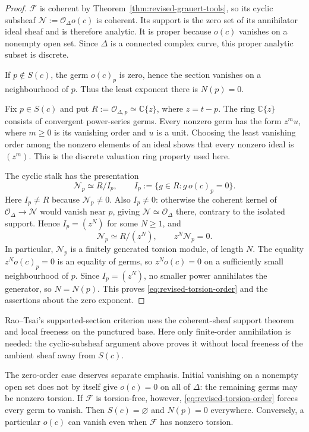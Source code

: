 \documentclass[11pt]{amsart}
\numberwithin{equation}{section}
\theoremstyle{plain}
\theoremstyle{definition}
\newcommand{\C}{\mathbb C}
\newcommand{\cF}{\mathcal F}
\newcommand{\cN}{\mathcal N}
\newcommand{\cO}{\mathcal O}
\begin{document}
\begin{proof}
$\cF$ is coherent by Theorem~\ref{thm:revised-grauert-tools}, so its cyclic
subsheaf $\cN:=\cO_\Delta o(c)$ is coherent.  Its support is the zero set
of its annihilator ideal sheaf and is therefore analytic.  It is proper
because $o(c)$ vanishes on a nonempty open set.  Since $\Delta$ is a
connected complex curve, this proper analytic subset is discrete.

If $p\notin S(c)$, the germ $o(c)_p$ is zero, hence the section vanishes
on a neighbourhood of $p$.  Thus the least exponent there is $N(p)=0$.

Fix $p\in S(c)$ and put $R:=\cO_{\Delta,p}\simeq\C\{z\}$, where
$z=t-p$.  The ring $\C\{z\}$ consists of convergent power-series germs.
Every nonzero germ has the form $z^m u$, where $m\ge0$ is its vanishing
order and $u$ is a unit.  Choosing the least vanishing order among the
nonzero elements of an ideal shows that every nonzero ideal is $(z^m)$.
This is the discrete valuation ring property used here.

The cyclic stalk has the presentation
\[
 \cN_p\simeq R/I_p,\qquad
 I_p:=\{g\in R:g\,o(c)_p=0\}.
\]
Here $I_p\ne R$ because $\cN_p\ne0$.  Also $I_p\ne0$: otherwise the
coherent kernel of $\cO_\Delta\to\cN$ would vanish near $p$, giving
$\cN\simeq\cO_\Delta$ there, contrary to the isolated support.  Hence
$I_p=(z^N)$ for some $N\ge1$, and
\[
 \cN_p\simeq R/(z^N),\qquad z^N\cN_p=0.
\]
In particular, $\cN_p$ is a finitely generated torsion module, of length
$N$.  The equality $z^No(c)_p=0$ is an equality of germs, so
$z^No(c)=0$ on a sufficiently small neighbourhood of $p$.
Since $I_p=(z^N)$, no smaller power annihilates the generator, so
$N=N(p)$.  This proves \eqref{eq:revised-torsion-order} and the assertions about
the zero exponent.
\end{proof}

Rao--Tsai's supported-section criterion
\cite[Proposition~4.5]{RT21} uses the coherent-sheaf support theorem
\cite[Chapter~II, Proposition~3.2]{BS76} and local freeness on the
punctured base.  Here only finite-order annihilation is needed:
the cyclic-subsheaf argument above proves it without local freeness
of the ambient sheaf away from $S(c)$.

The zero-order case deserves separate emphasis.  Initial vanishing on
a nonempty open set does not by itself give $o(c)=0$ on all of $\Delta$:
the remaining germs may be nonzero torsion.  If $\cF$ is torsion-free,
however, \eqref{eq:revised-torsion-order} forces every germ to vanish.  Then
$S(c)=\varnothing$ and $N(p)=0$ everywhere.  Conversely, a particular
$o(c)$ can vanish even when $\cF$ has nonzero torsion.
\end{document}
